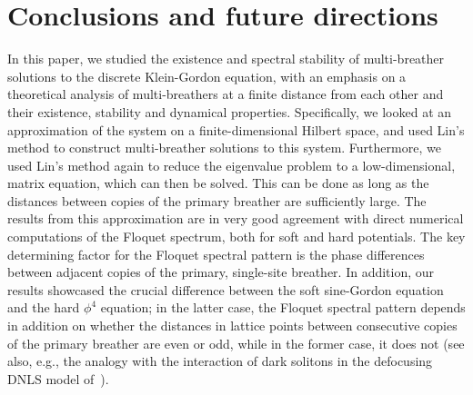 \documentclass[12pt,reqno]{amsart}
\theoremstyle{definition}
\begin{document}
\section{Conclusions and future directions}\label{sec:conc}

In this paper, we studied the existence and spectral stability of multi-breather solutions to the discrete Klein-Gordon equation,
with an emphasis on a theoretical analysis of multi-breathers
at a finite distance from each other and their existence, 
stability and dynamical properties. Specifically, we looked at an approximation of the system on a finite-dimensional Hilbert space, and used Lin's method to construct multi-breather solutions to this system. Furthermore, we used Lin's method again to reduce the eigenvalue problem to a low-dimensional, matrix equation, which can then be solved. This can be done as long as the distances between copies of the primary breather are sufficiently large. The results from this approximation are in very good agreement with direct numerical computations of the Floquet spectrum, both for soft and hard potentials. The key determining factor for the Floquet spectral pattern is the phase differences between adjacent copies of the primary, single-site breather. In addition, our results
showcased the crucial difference between the soft sine-Gordon equation and the hard $\phi^4$ equation; in the latter case, the Floquet spectral pattern depends in addition on whether the distances in lattice points between consecutive copies of the primary breather are even or odd, while in the former case, it does 
not (see also, e.g., the analogy  with the interaction of dark
solitons in the defocusing DNLS model of~\cite{Pelinovsky_2008}). 
\end{document}
